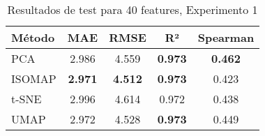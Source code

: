 \begin{table}[h]
\centering
\begin{tabular}{lcccc}
\toprule
\textbf{Método} & \textbf{MAE} & \textbf{RMSE} & \textbf{R²} & \textbf{Spearman} \\
\midrule
PCA & 2.986 & 4.559 & \textbf{0.973} & \textbf{0.462} \\
ISOMAP & \textbf{2.971} & \textbf{4.512} & \textbf{0.973} & 0.423 \\
t-SNE & 2.996 & 4.614 & 0.972 & 0.438 \\
UMAP & 2.972 & 4.528 & \textbf{0.973} & 0.449 \\
\bottomrule
\end{tabular}
\caption{Resultados de test para 40 features, Experimento 1}
\label{tab:test_results_40feat_exp1}
\end{table}